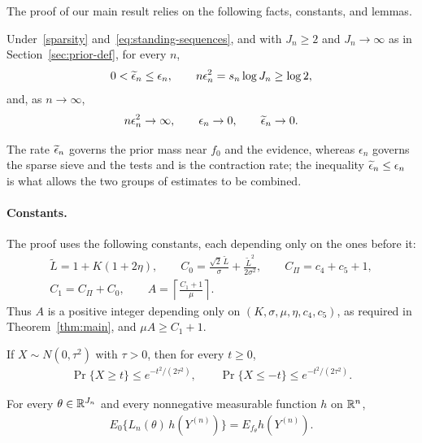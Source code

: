 The proof of our main result relies on the following facts, constants, and lemmas.

\begin{fact}\label{fact:rates}
Under~\eqref{sparsity} and~\eqref{eq:standing-sequences}, and with $J_n\geq2$ and $J_n\to\infty$ as in Section~\ref{sec:prior-def}, for every $n$,
\begin{align}
0<\widetilde{\epsilon}_n\leq\epsilon_n,
\qquad
n\epsilon_n^2=s_n\log J_n\geq\log2,
\label{eq:rate-relations}
\end{align}
and, as $n\to\infty$,
\begin{align}
n\epsilon_n^2\to\infty,\qquad
\epsilon_n\to0,\qquad
\widetilde{\epsilon}_n\to0 .
\label{eq:rate-limits}
\end{align}
\end{fact}


The rate $\widetilde{\epsilon}_n$ governs the prior mass near $f_0$ and the evidence, whereas $\epsilon_n$ governs the sparse sieve and the tests and is the contraction rate; the inequality $\widetilde{\epsilon}_n\leq\epsilon_n$ is what allows the two groups of estimates to be combined.

\paragraph*{Constants.}
The proof uses the following constants, each depending only on the ones before it:
\begin{gather}
\widetilde L=1+K(1+2\eta),
\qquad
C_0=\frac{\sqrt2\,\widetilde L}{\sigma}+\frac{\widetilde L^2}{2\sigma^2},
\qquad
C_\Pi=c_4+c_5+1,
\label{eq:constants}\\
C_1=C_\Pi+C_0,
\qquad
A=\left\lceil\frac{C_1+1}{\mu}\right\rceil .
\label{eq:constants-A}
\end{gather}
Thus $A$ is a positive integer depending only on $(K,\sigma,\mu,\eta,c_4,c_5)$, as required in Theorem~\ref{thm:main}, and $\mu A\geq C_1+1$.

\begin{fact}\label{fact:gauss}
If $X\sim N(0,\tau^2)$ with $\tau>0$, then for every $t\geq0$,
\begin{align}
\Pr\{X\geq t\}\leq e^{-t^2/(2\tau^2)},
\qquad
\Pr\{X\leq-t\}\leq e^{-t^2/(2\tau^2)} .
\label{eq:gausstail}
\end{align}
\end{fact}

\begin{fact}\label{fact:com}
For every $\theta\in\mathbb{R}^{J_n}$ and every nonnegative measurable function $h$ on $\mathbb{R}^n$,
\begin{align}
E_0\{L_n(\theta)\,h(Y^{(n)})\}=E_{f_\theta}h(Y^{(n)}).
\label{eq:com}
\end{align}
\end{fact}


